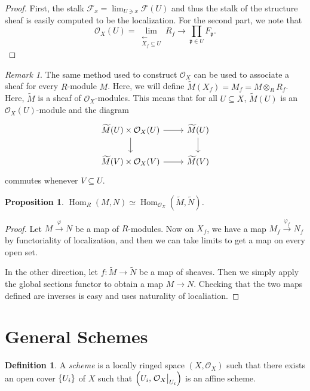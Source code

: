 \documentclass[leqno, openany]{memoir}
\newtheorem{prop}[thm]{Proposition}
\theoremstyle{definition}
\newtheorem{defn}[thm]{Definition}
\theoremstyle{remark}
\newtheorem{rmk}[thm]{Remark}
\theoremstyle{plain}
\theoremstyle{definition}
\theoremstyle{remark}
\newcommand{\mc}[1]{\mathcal{#1}}
\newcommand{\mf}[1]{\mathfrak{#1}}
\newcommand{\wt}[1]{\widetilde{#1}}
\DeclareMathOperator{\Hom}{Hom}
\begin{document}
\begin{proof}
    First, the stalk $\mc{F}_x = \lim_{U \ni x} \mc{F}(U)$ and thus the stalk of the structure sheaf is easily computed to be the localization. For the second part, we note that
    \[ \mc{O}_X(U) = \lim_{\substack{\longleftarrow \\ X_f \subseteq U}} R_f \longrightarrow \prod_{\mf{p} \in U} F_{\mf{p}}. \]
\end{proof}

\begin{rmk}
    The same method used to construct $\mc{O}_X$ can be used to associate a sheaf for every $R$-module $M$. Here, we will define $\wt{M}(X_f) = M_f = M \otimes_R R_f$. Here, $\wt{M}$ is a sheaf of $\mc{O}_X$-modules. This means that for all $U \subseteq X$, $\wt{M}(U)$ is an $\mc{O}_X(U)$-module and the diagram
    \begin{equation*}
    \begin{tikzcd}
        \wt{M}(U) \times \mc{O}_X(U) \arrow{r} \arrow{d} & \wt{M}(U) \arrow{d} \\
        \wt{M}(V) \times \mc{O}_X(V) \arrow{r} & \wt{M}(V)
    \end{tikzcd}
    \end{equation*}
    commutes whenever $V \subseteq U$.
\end{rmk}

\begin{prop}
    $\Hom_R(M,N) \simeq \Hom_{\mc{O}_X}(\wt{M}, \wt{N})$.
\end{prop}

\begin{proof}
    Let $M \xrightarrow{\varphi} N$ be a map of $R$-modules. Now on $X_f$, we have a map $M_f \xrightarrow{\varphi_f} N_f$ by functoriality of localization, and then we can take limits to get a map on every open set.

    In the other direction, let $f \colon \wt{M} \to \wt{N}$ be a map of sheaves. Then we simply apply the global sections functor to obtain a map $M \to N$. Checking that the two maps defined are inverses is easy and uses naturality of localiation.
\end{proof}

\section{General Schemes}%
\label{sec:general_schemes}

\begin{defn}
    A \textit{scheme} is a locally ringed space $(X, \mc{O}_X)$ such that there exists an open cover $\qty{U_i}$ of $X$ such that $\qty(U_i, \eval{\mc{O}_X}_{U_i})$ is an affine scheme.
\end{defn}
\end{document}
